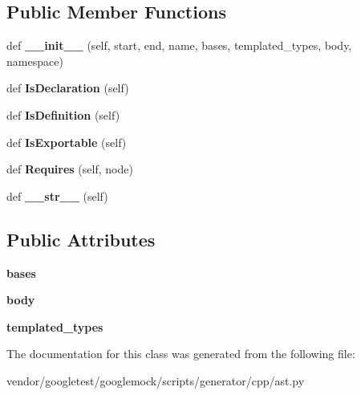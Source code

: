 \subsection*{Public Member Functions}
\begin{DoxyCompactItemize}
\item 
def {\bfseries \+\_\+\+\_\+init\+\_\+\+\_\+} (self, start, end, name, bases, templated\+\_\+types, body, namespace)\hypertarget{classcpp_1_1ast_1_1Class_acc17c34512d5cc54d5125734ce79f219}{}\label{classcpp_1_1ast_1_1Class_acc17c34512d5cc54d5125734ce79f219}

\item 
def {\bfseries Is\+Declaration} (self)\hypertarget{classcpp_1_1ast_1_1Class_a4758bfb7c00410575932974e1ed8b7da}{}\label{classcpp_1_1ast_1_1Class_a4758bfb7c00410575932974e1ed8b7da}

\item 
def {\bfseries Is\+Definition} (self)\hypertarget{classcpp_1_1ast_1_1Class_ae6d2356f835d06d5109d9e4609d86780}{}\label{classcpp_1_1ast_1_1Class_ae6d2356f835d06d5109d9e4609d86780}

\item 
def {\bfseries Is\+Exportable} (self)\hypertarget{classcpp_1_1ast_1_1Class_a1ab749f8cfddb0903c6484791f70f42e}{}\label{classcpp_1_1ast_1_1Class_a1ab749f8cfddb0903c6484791f70f42e}

\item 
def {\bfseries Requires} (self, node)\hypertarget{classcpp_1_1ast_1_1Class_a347673e0a2a7b840b7d2d1cae13977f7}{}\label{classcpp_1_1ast_1_1Class_a347673e0a2a7b840b7d2d1cae13977f7}

\item 
def {\bfseries \+\_\+\+\_\+str\+\_\+\+\_\+} (self)\hypertarget{classcpp_1_1ast_1_1Class_a0a63f6fab75d61ffac6fb9f1c29ae84d}{}\label{classcpp_1_1ast_1_1Class_a0a63f6fab75d61ffac6fb9f1c29ae84d}

\end{DoxyCompactItemize}
\subsection*{Public Attributes}
\begin{DoxyCompactItemize}
\item 
{\bfseries bases}\hypertarget{classcpp_1_1ast_1_1Class_a5665eb67314a075d4e0ff91accbde5d1}{}\label{classcpp_1_1ast_1_1Class_a5665eb67314a075d4e0ff91accbde5d1}

\item 
{\bfseries body}\hypertarget{classcpp_1_1ast_1_1Class_add39f61fdcf6dae42d79cac3dcbb7782}{}\label{classcpp_1_1ast_1_1Class_add39f61fdcf6dae42d79cac3dcbb7782}

\item 
{\bfseries templated\+\_\+types}\hypertarget{classcpp_1_1ast_1_1Class_a48ed0d3115656554d9134bc1787390fa}{}\label{classcpp_1_1ast_1_1Class_a48ed0d3115656554d9134bc1787390fa}

\end{DoxyCompactItemize}


The documentation for this class was generated from the following file\+:\begin{DoxyCompactItemize}
\item 
vendor/googletest/googlemock/scripts/generator/cpp/ast.\+py\end{DoxyCompactItemize}
